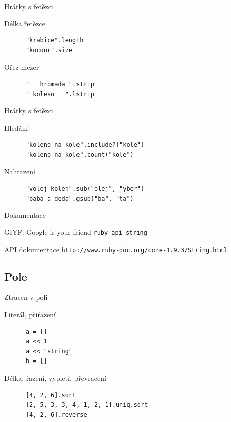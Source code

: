 \documentclass{beamer}
\begin{document}
\begin{frame}[fragile]{Hrátky s řetězci}
  \begin{block}{Délka řetězce}
    \begin{verbatim}
      "krabice".length
      "kocour".size
    \end{verbatim}
  \end{block}
  \pause
  \begin{block}{Ořez mezer}
    \begin{verbatim}
      "   hromada ".strip
      " koleso   ".lstrip
    \end{verbatim}
  \end{block}
\end{frame}

\begin{frame}[fragile]{Hrátky s řetězci}
  \begin{block}{Hledání}
    \begin{verbatim}
      "koleno na kole".include?("kole")
      "koleno na kole".count("kole")
    \end{verbatim}
  \end{block}
  \pause
  \begin{block}{Nahrazení}
    \begin{verbatim}
      "volej kolej".sub("olej", "yber")
      "baba a deda".gsub("ba", "ta")
    \end{verbatim}
  \end{block}
\end{frame}

\begin{frame}{Dokumentace}
  \begin{block}{GIYF: Google is your friend}
    \texttt{ruby api string}
  \end{block}
  \begin{block}{API dokumentace}
    \texttt{http://www.ruby-doc.org/core-1.9.3/String.html}
  \end{block}
\end{frame}

\subsection{Pole}

\begin{frame}[fragile]{Ztracen v poli}
  \begin{block}{Literál, přiřazení}
    \begin{verbatim}
      a = []
      a << 1
      a << "string"
      b = []
    \end{verbatim}
  \end{block}
  \pause
  \begin{block}{Délka, řazení, vypletí, převracení}
    \begin{verbatim}
      [4, 2, 6].sort
      [2, 5, 3, 3, 4, 1, 2, 1].uniq.sort
      [4, 2, 6].reverse
    \end{verbatim}
  \end{block}
\end{frame}
\end{document}
